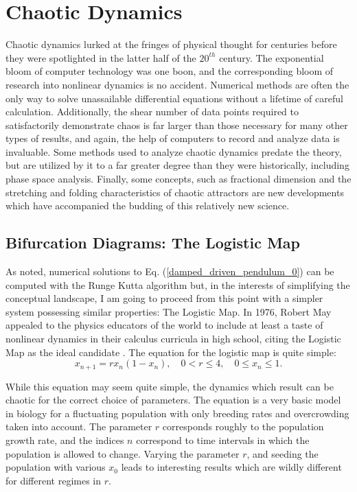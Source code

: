 \documentclass[12pt,twoside]{reedthesis}
\begin{document}
	
	
\chapter{Chaotic Dynamics}


Chaotic dynamics lurked at the fringes of physical thought for centuries before they were spotlighted in the latter half of the $20^{th}$ century.  The exponential bloom of computer technology was one boon, and the corresponding bloom of research into nonlinear dynamics is no accident.  Numerical methods are often the only way to solve unassailable differential equations without a lifetime of careful calculation.  Additionally, the shear number of data points required to satisfactorily demonstrate chaos is far larger than those necessary for many other types of results, and again, the help of computers to record and analyze data is invaluable.  Some methods used to analyze chaotic dynamics predate the theory, but are utilized by it to a far greater degree than they were historically, including phase space analysis.  Finally, some concepts, such as fractional dimension and the stretching and folding characteristics of chaotic attractors are new developments which have accompanied the budding of this relatively new science.  


\section{Bifurcation Diagrams: The Logistic Map}

As noted, numerical solutions to Eq. (\ref{damped_driven_pendulum_0}) can be computed with the Runge Kutta algorithm but, in the interests of simplifying the conceptual landscape, I am going to proceed from this point with a simpler system possessing similar properties: The Logistic Map.  In 1976, Robert May appealed to the physics educators of the world to include at least a taste of nonlinear dynamics in their calculus curricula in high school, citing the Logistic Map as the ideal candidate \cite{may1976}.  The equation for the logistic map is quite simple:
\begin{equation}
\label{logistic_map}
x_{n+1} = rx_n(1-x_n), \quad 0 < r \leq 4, \quad 0 \leq x_n \leq 1 .
\end{equation}

While this equation may seem quite simple, the dynamics which result can be chaotic for the correct choice of parameters.  The equation is a very basic model in biology for a fluctuating population with only breeding rates and overcrowding taken into account.   The parameter $r$ corresponds roughly to the population growth rate, and the indices $n$ correspond to time intervals in which the population is allowed to change.  Varying the parameter $r$, and seeding the population with various $x_0$ leads to interesting results which are wildly different for different regimes in $r$.  
\end{document}
